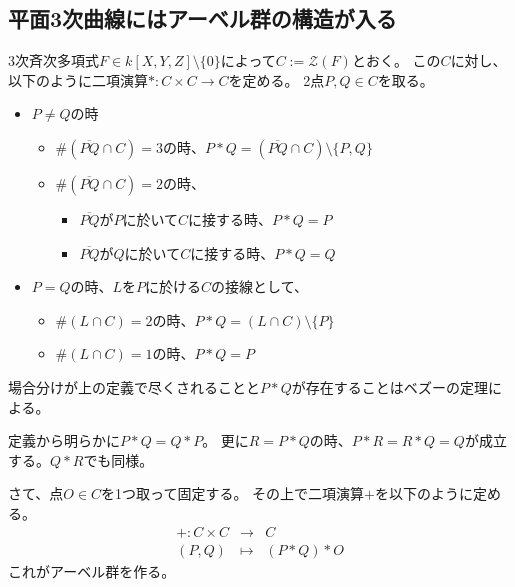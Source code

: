 \documentclass[a4]{article}
\begin{document}
    \subsection{平面3次曲線にはアーベル群の構造が入る}
        \begin{Def}
        3次斉次多項式$F \in k[X,Y,Z] \setminus \{0\}$によって$C:=\mathcal{Z}(F)$とおく。
        この$C$に対し、以下のように二項演算$\ast : C \times C \to C$を定める。
        2点$P, Q \in C$を取る。
            \begin{itemize}
            \item $P \neq Q$の時
                \begin{itemize}
                    \item $\#(\overline{PQ} \cap C)=3$の時、$P \ast Q=(\overline{PQ} \cap C) \setminus \{P, Q\}$
                    \item $\#(\overline{PQ} \cap C)=2$の時、
                        \begin{itemize}
                            \item $\overline{PQ}$が$P$に於いて$C$に接する時、$P \ast Q=P$
                            \item $\overline{PQ}$が$Q$に於いて$C$に接する時、$P \ast Q=Q$
                        \end{itemize}
                \end{itemize}
            \item $P = Q$の時、$L$を$P$に於ける$C$の接線として、
                \begin{itemize}
                    \item $\#(L \cap C)=2$の時、$P \ast Q=(L \cap C) \setminus \{P\}$
                    \item $\#(L \cap C)=1$の時、$P \ast Q=P$
                \end{itemize}
            \end{itemize}
        \end{Def}
        場合分けが上の定義で尽くされることと$P \ast Q$が存在することはベズーの定理による。

        \begin{Remark} \label{remark401}
            定義から明らかに$P \ast Q=Q \ast P$。
            更に$R=P \ast Q$の時、$P \ast R=R \ast Q=Q$が成立する。$Q \ast R$でも同様。
        \end{Remark}

        さて、点$O \in C$を1つ取って固定する。
        その上で二項演算$+$を以下のように定める。
        \begin{eqnarray*}
            + : C \times C &\to& C \\
            (P, Q) &\mapsto& (P \ast Q) \ast O
        \end{eqnarray*}
        これがアーベル群を作る。
\end{document}
